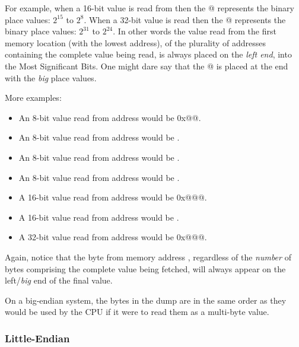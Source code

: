For example, when a 16-bit value is read from \colorbox{c_lightblue}{}
then the {\color{red}@} represents 
the binary place values: $2^{15}$ to $2^8$.
When a 32-bit value is read then the {\color{red}@} represents
the binary place values: $2^{31}$ to $2^{24}$.  
In other words the value read from the first memory location (with the 
lowest address), of the plurality of addresses containing the complete 
value being read, is always placed on the {\em left end}, into the 
Most Significant Bits.  One might dare say that the {\color{red}@} 
is placed at the end with the {\em big} place values.

More examples:

\begin{itemize}
\item An 8-bit value read from address \colorbox{c_lightgreen}{} would be \verb@0x@{\color{red}@}.
\item An 8-bit value read from address  would be .
\item An 8-bit value read from address  would be .
\item An 8-bit value read from address  would be .
\item A 16-bit value read from address \colorbox{c_lightgreen}{} would be \verb@0x@{\color{red}@}@.
\item A 16-bit value read from address  would be .
\item A 32-bit value read from address \colorbox{c_lightgreen}{} would be \verb@0x@{\color{red}@}@.
\end{itemize}

Again, notice that the byte from memory address \colorbox{c_lightgreen}{}, 
regardless of the {\em number} of bytes comprising the complete value being 
fetched, will always appear on the left/{\em big} end of the final value.


\begin{tcolorbox}
On a big-endian system, the bytes in the dump are in the same order as 
they would be used by the CPU if it were to read them as a multi-byte 
value.
\end{tcolorbox}

\subsubsection{Little-Endian}
\label{LittleEndian}

